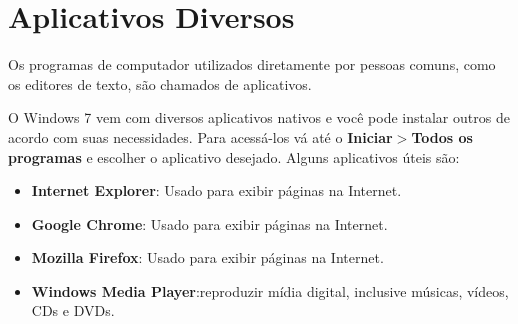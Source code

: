 \documentclass[hidelinks,12pt]{article}
\begin{document}
		\section{Aplicativos Diversos}

			Os programas de computador utilizados diretamente por pessoas comuns, como os editores de texto, são chamados de aplicativos.

			O Windows 7 vem com diversos aplicativos nativos e você pode instalar outros de acordo com suas necessidades. Para acessá-los vá até o {\bf Iniciar$>$Todos os programas} e escolher o aplicativo desejado. Alguns aplicativos úteis são:

			\begin{itemize}
				\item{
					{\bf Internet Explorer}: Usado para exibir páginas na Internet.
			}



			\item{
				{\bf Google Chrome}: Usado para exibir páginas na Internet.
				}

				\item{
					{\bf Mozilla Firefox}: Usado para exibir páginas na Internet.
					}


				\item{
					{\bf Windows Media Player}:reproduzir mídia digital, inclusive músicas, vídeos, CDs e DVDs.
					}

			\end{itemize}
\end{document}
